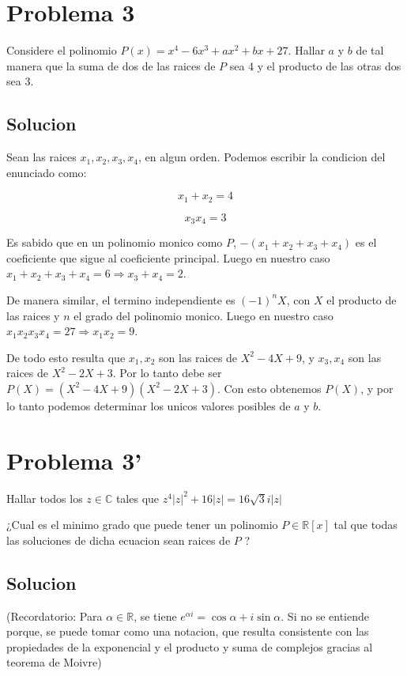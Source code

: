 \documentclass{article}
\begin{document}
\section{Problema 3}

Considere el polinomio $P(x) = x^4 - 6x^3 + ax^2 + bx + 27$. Hallar $a$ y $b$ de tal manera que la suma de dos de las raices de $P$
sea 4 y el producto de las otras dos sea 3.

\subsection{Solucion}

Sean las raices $x_1,x_2,x_3,x_4$, en algun orden. Podemos escribir la condicion del enunciado como:

$$x_1 + x_2 = 4$$

$$x_3 x_4 = 3$$

Es sabido que en un polinomio monico como $P$, $-(x_1 + x_2 + x_3 + x_4)$ es el coeficiente que sigue al coeficiente principal.
Luego en nuestro caso $x_1 + x_2 + x_3 + x_4 = 6 \Rightarrow x_3 + x_4 = 2$.

De manera similar, el termino independiente es $(-1)^n X$, con $X$ el producto de las raices y $n$ el grado del polinomio monico.
Luego en nuestro caso $x_1x_2x_3x_4 = 27 \Rightarrow x_1x_2 = 9$.

De todo esto resulta que $x_1,x_2$ son las raices de $X^2 - 4X + 9$, y $x_3,x_4$ son las raices de $X^2 -2X +3$.
Por lo tanto debe ser $P(X) = (X^2-4X+9)(X^2-2X+3)$. Con esto obtenemos $P(X)$, y por lo tanto podemos determinar los unicos
valores posibles de $a$ y $b$.

\section{Problema 3'}

Hallar todos los $z \in \mathbb{C}$ tales que $z^4|z|^2 + 16|z| = 16\sqrt{3}i|z|$

¿Cual es el minimo grado que puede tener un polinomio $P \in \mathbb{R}[x]$ tal que todas las soluciones de dicha ecuacion sean raices de $P$ ?

\subsection{Solucion}

(Recordatorio: Para $\alpha \in \mathbb{R}$, se tiene $e^{\alpha i} = \cos \alpha + i \sin \alpha$. Si no se entiende porque, se
puede tomar como una notacion, que resulta consistente con las propiedades de la exponencial y el producto y suma de complejos gracias
al teorema de Moivre)
\end{document}
